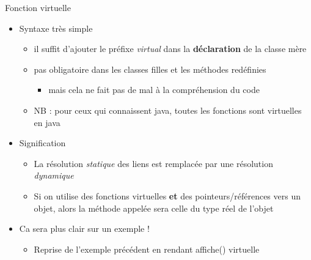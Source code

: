 \begin{frame}{Fonction virtuelle}

\begin{itemize}
\itemsep1pt\parskip0pt
\item
  Syntaxe très simple

  \begin{itemize}
  \itemsep1pt\parskip0pt
  \item
    il suffit d'ajouter le préfixe \emph{virtual} dans la
    \textbf{déclaration} de la classe mère
  \item
    pas obligatoire dans les classes filles et les méthodes redéfinies

    \begin{itemize}
    \itemsep1pt\parskip0pt
    \item
      mais cela ne fait pas de mal à la compréhension du code
    \end{itemize}
  \item
    NB : pour ceux qui connaissent java, toutes les fonctions sont
    virtuelles en java
  \end{itemize}
\item
  Signification

  \begin{itemize}
  \itemsep1pt\parskip0pt
  \item
    La résolution \emph{statique} des liens est remplacée par une
    résolution \emph{dynamique}
  \item
    Si on utilise des fonctions virtuelles \textbf{et} des
    pointeurs/références vers un objet, alors la méthode appelée sera
    celle du type réel de l'objet
  \end{itemize}
\item
  Ca sera plus clair sur un exemple !

  \begin{itemize}
  \itemsep1pt\parskip0pt
  \item
    Reprise de l'exemple précédent en rendant affiche() virtuelle
  \end{itemize}
\end{itemize}

\end{frame}

